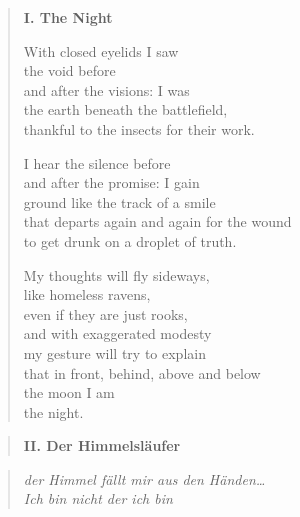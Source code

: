 \begin{verse}

{\bfseries I. The Night}

With closed eyelids I saw\\
the void before\\
and after the visions: I was\\
the earth beneath the battlefield,\\
thankful to the insects for their work.

I hear the silence before\\
and after the promise: I gain\\
ground like the track of a smile\\
that departs again and again for the wound\\
to get drunk on a droplet of truth.

My thoughts will fly sideways,\\
like homeless ravens,\\
even if they are just rooks,\\
and with exaggerated modesty\\
my gesture will try to explain\\
that in front, behind, above and below\\
the moon I am\\
the night.
\end{verse}

\clearpage

\begin{verse}
{\bfseries II. Der Himmelsläufer}
\end{verse}

\begin{quote}
\itshape\smaller
der Himmel fällt mir aus den Händen\ldots\\
Ich bin nicht der ich bin

\end{quote}

